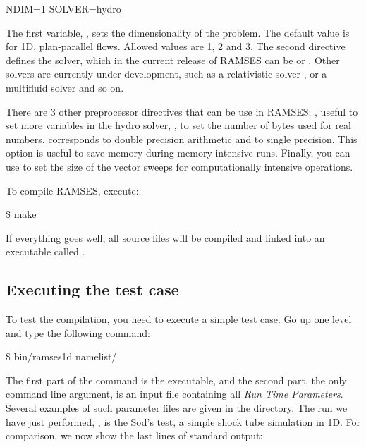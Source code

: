 \begin{Prompt}
NDIM=1
SOLVER=hydro
\end{Prompt}

The first variable, , sets the dimensionality of the
problem. The default value is for 1D, plan-parallel flows. Allowed
values are 1, 2 and 3. The second directive defines the solver, which in
the current release of RAMSES can be  or .
Other solvers are currently under development, such as a relativistic
solver , or a multifluid solver
 and so on.

There are 3 other preprocessor directives that can be use in RAMSES:
, useful to set more variables in the
hydro solver, , to set the number of bytes used
for real numbers.  corresponds to double precision
arithmetic and  to single precision. This option is useful
to save memory during memory intensive runs. Finally, you can use
 to set the size of the vector sweeps for
computationally intensive operations.

To compile RAMSES, execute:

\begin{Prompt}
\$ make
\end{Prompt}

If everything goes well, all source files will be compiled and linked
into an executable called .

\subsection{Executing the test case}

To test the compilation, you need to execute a simple test case. Go up
one level and type the following command:

\begin{Prompt}
\$ bin/ramses1d namelist/{\nmlfilename}
\end{Prompt}

The first part of the command is the executable, and the second part, the only
command line argument, is an input file containing all \emph{Run Time
Parameters}. Several examples of such parameter files are given in the
 directory. The run we have just performed, \cmd{\nmlfilename},
is the Sod's test, a simple shock tube simulation in 1D. For comparison, we now
show the last {\lastlinescount} lines of standard output:

